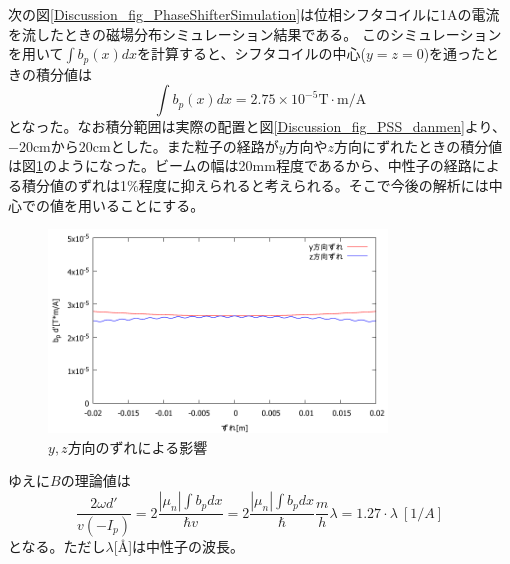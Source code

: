 次の図\ref{Discussion_fig_PhaseShifterSimulation}は位相シフタコイルに1Aの電流を流したときの磁場分布シミュレーション結果である。%
このシミュレーションを用いて$\int b_p(x) dx$を計算すると、シフタコイルの中心($y=z=0$)を通ったときの積分値は
\begin{equation}
\int b_p(x) dx =2.75 \times 10^{-5} \mathrm{T\cdot m/A}
\end{equation}
となった。なお積分範囲は実際の配置と図\ref{Discussion_fig_PSS_danmen}より、$-20$cmから$20$cmとした。また粒子の経路が$y$方向や$z$方向にずれたときの積分値は図\ref{Discussion_fig_PSS_zure}のようになった。ビームの幅は20mm程度であるから、中性子の経路による積分値のずれは1\%程度に抑えられると考えられる。そこで今後の解析には中心での値を用いることにする。
\begin{figure}[h]
\centering
\includegraphics[width=9cm]{discussion/B/bd.pdf}
\caption{$y,z$方向のずれによる影響} \label{Discussion_fig_PSS_zure}
\vspace{-5mm}
\end{figure}

ゆえに$B$の理論値は
\begin{equation}
\frac{2\omega d'}{v(-I_p)}=2\frac{|\mu_n|\int b_p dx}{\hbar v}=2\frac{|\mu_n|\int b_p dx}{\hbar}\frac{m}{h}\lambda=1.27 \cdot \lambda \ [1/A] \label{Discussion_theory_B}
\end{equation}
となる。ただし$\lambda$[\AA]は中性子の波長。 

